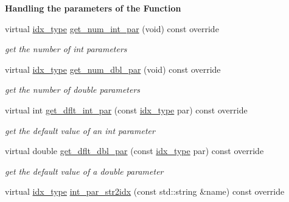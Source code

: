 \begin{Indent}\textbf{ Handling the parameters of the Function}\par
\begin{DoxyCompactItemize}
\item 
virtual \mbox{\hyperlink{class_s_m_spp__di__unipi__it_1_1_thin_compute_interface_aa3d710629ad8c434286726ad810c3b47}{idx\+\_\+type}} \mbox{\hyperlink{class_s_m_spp__di__unipi__it_1_1_c05_function_a3ad74d9506761eb2ca4c8a936fb7a1c5}{get\+\_\+num\+\_\+int\+\_\+par}} (void) const override
\begin{DoxyCompactList}\small\item\em get the number of int parameters \end{DoxyCompactList}\item 
virtual \mbox{\hyperlink{class_s_m_spp__di__unipi__it_1_1_thin_compute_interface_aa3d710629ad8c434286726ad810c3b47}{idx\+\_\+type}} \mbox{\hyperlink{class_s_m_spp__di__unipi__it_1_1_c05_function_a842fd454acaded84baf6b77e0d61a950}{get\+\_\+num\+\_\+dbl\+\_\+par}} (void) const override
\begin{DoxyCompactList}\small\item\em get the number of double parameters \end{DoxyCompactList}\item 
virtual int \mbox{\hyperlink{class_s_m_spp__di__unipi__it_1_1_c05_function_a75dd1491b74c4b9476755e061dce3e04}{get\+\_\+dflt\+\_\+int\+\_\+par}} (const \mbox{\hyperlink{class_s_m_spp__di__unipi__it_1_1_thin_compute_interface_aa3d710629ad8c434286726ad810c3b47}{idx\+\_\+type}} par) const override
\begin{DoxyCompactList}\small\item\em get the default value of an int parameter \end{DoxyCompactList}\item 
virtual double \mbox{\hyperlink{class_s_m_spp__di__unipi__it_1_1_c05_function_a465a771c115acf8d5f4e32e22f003014}{get\+\_\+dflt\+\_\+dbl\+\_\+par}} (const \mbox{\hyperlink{class_s_m_spp__di__unipi__it_1_1_thin_compute_interface_aa3d710629ad8c434286726ad810c3b47}{idx\+\_\+type}} par) const override
\begin{DoxyCompactList}\small\item\em get the default value of a double parameter \end{DoxyCompactList}\item 
virtual \mbox{\hyperlink{class_s_m_spp__di__unipi__it_1_1_thin_compute_interface_aa3d710629ad8c434286726ad810c3b47}{idx\+\_\+type}} \mbox{\hyperlink{class_s_m_spp__di__unipi__it_1_1_c05_function_ae281b6699b0707a5cdc1e82b76d26c09}{int\+\_\+par\+\_\+str2idx}} (const std\+::string \&name) const override

\end{DoxyCompactItemize}
\end{Indent}

